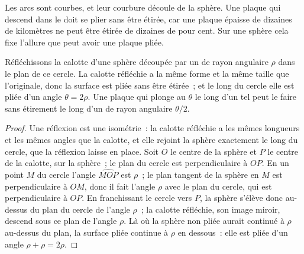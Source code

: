 Les arcs sont courbes, et leur courbure découle de la sphère. Une plaque qui
descend dans le  doit se plier sans être étirée, car une plaque épaisse de dizaines
de kilomètres ne peut être étirée de dizaines de pour cent. Sur une sphère cela
fixe l'allure que peut avoir une plaque pliée.

\begin{proposition}\label{prop:b1:active-margins:shell}
Réfléchissons la calotte d'une sphère découpée par un  de rayon angulaire
$\rho$ dans le plan de ce cercle. La calotte réfléchie a la même forme et la même
taille que l'originale, donc la surface est pliée sans être étirée~; et
le long du cercle elle est pliée d'un angle $\theta = 2\rho$. Une plaque qui plonge au  $\theta$ le long d'un tel  peut
le faire sans étirement le long d'un  de rayon angulaire $\theta/2$.
\end{proposition}

\begin{proof}
Une réflexion est une isométrie~: la calotte réfléchie a les mêmes longueurs et les mêmes
angles que la calotte, et elle rejoint la sphère exactement le long du cercle, que la
réflexion laisse en place. Soit $O$ le centre de la sphère et $P$ le
centre de la calotte, sur la sphère~; le plan du cercle est perpendiculaire à
$OP$. En un point $M$ du cercle l'angle $\widehat{MOP}$ est $\rho$~; le
plan tangent de la sphère en $M$ est perpendiculaire à $OM$, donc il fait
l'angle $\rho$ avec le plan du cercle, qui est perpendiculaire à $OP$.
En franchissant le cercle vers $P$, la sphère s'élève donc au-dessus du plan du
cercle de l'angle $\rho$~; la calotte réfléchie, son image miroir, descend
sous ce plan de l'angle $\rho$. Là où la sphère non pliée aurait continué
à $\rho$ au-dessus du plan, la surface pliée continue à $\rho$ en dessous~: elle est
pliée d'un angle $\rho + \rho = 2\rho$.
\end{proof}

